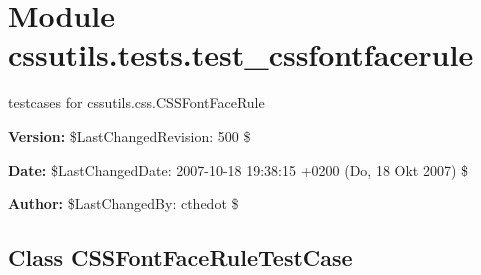 %
%
%


\section{Module cssutils.tests.test\_cssfontfacerule}

    \label{cssutils:tests:test_cssfontfacerule}
testcases for cssutils.css.CSSFontFaceRule

\textbf{Version:} \$LastChangedRevision: 500 \$



\textbf{Date:} \$LastChangedDate: 2007-10-18 19:38:15 +0200 (Do, 18 Okt 2007) \$



\textbf{Author:} \$LastChangedBy: cthedot \$





\subsection{Class CSSFontFaceRuleTestCase}


